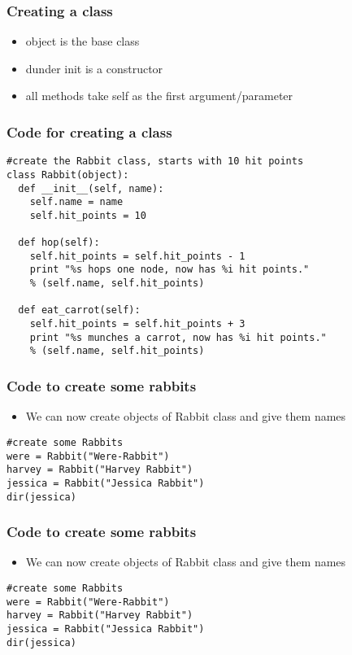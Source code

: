 \documentclass{beamer}
\begin{document}
\begin{frame}[fragile]
\frametitle{Creating a class}
\begin{itemize}
\item object is the base class
\item dunder init is a constructor
\item all methods take self as the first argument/parameter
\end{itemize}
\end{frame}

\begin{frame}[fragile]
\frametitle{Code for creating a class}
\begin{lstlisting}
#create the Rabbit class, starts with 10 hit points
class Rabbit(object):
  def __init__(self, name):
    self.name = name
    self.hit_points = 10
        
  def hop(self):
    self.hit_points = self.hit_points - 1
    print "%s hops one node, now has %i hit points." 
    % (self.name, self.hit_points)
    
  def eat_carrot(self):
    self.hit_points = self.hit_points + 3
    print "%s munches a carrot, now has %i hit points." 
    % (self.name, self.hit_points)
\end{lstlisting} 
\end{frame}

\begin{frame}[fragile]
\frametitle{Code to create some rabbits}
\begin{itemize}
\item We can now create objects of Rabbit class and give them names
\end{itemize}
\begin{lstlisting}
#create some Rabbits
were = Rabbit("Were-Rabbit")
harvey = Rabbit("Harvey Rabbit")
jessica = Rabbit("Jessica Rabbit")
dir(jessica)
\end{lstlisting}
\end{frame}

\begin{frame}[fragile]
\frametitle{Code to create some rabbits}
\begin{itemize}
\item We can now create objects of Rabbit class and give them names
\end{itemize}
\begin{lstlisting}
#create some Rabbits
were = Rabbit("Were-Rabbit")
harvey = Rabbit("Harvey Rabbit")
jessica = Rabbit("Jessica Rabbit")
dir(jessica)
\end{lstlisting}
\end{frame}
\end{document}
